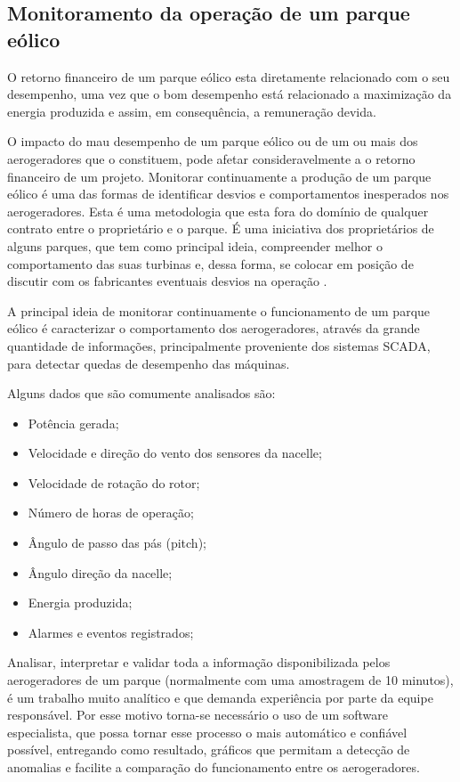 \subsection{Monitoramento da operação de um parque eólico }
\label{Sec:monitoramentoDeUmParqueEolico}

O retorno financeiro de um parque eólico esta diretamente relacionado com o seu desempenho, uma vez que o bom desempenho está relacionado a maximização da energia produzida e assim, em consequência, a remuneração devida.

O impacto do mau desempenho de um parque eólico ou de um ou mais dos aerogeradores que o constituem, pode afetar consideravelmente a o retorno financeiro de um projeto. Monitorar continuamente a produção de um parque eólico é uma das formas de identificar desvios e comportamentos inesperados nos aerogeradores. Esta é uma metodologia que esta fora do domínio de qualquer contrato entre o proprietário e o parque. É uma iniciativa dos proprietários de alguns parques, que tem como principal ideia, compreender melhor o comportamento das suas turbinas e, dessa forma, se colocar em posição de discutir com os fabricantes eventuais desvios na operação \cite{metodologia-avaliacao-desempenho-de-parques}.

A principal ideia de monitorar continuamente o funcionamento de um parque eólico é caracterizar o comportamento dos aerogeradores, através da grande quantidade de informações, principalmente proveniente dos sistemas SCADA, para detectar quedas de desempenho das máquinas.

Alguns dados que são comumente analisados são:
\begin{itemize}
    \item Potência gerada;
    \item Velocidade e direção do vento dos sensores da nacelle;
    \item Velocidade de rotação do rotor;
    \item Número de horas de operação;
    \item Ângulo de passo das pás (pitch);
    \item Ângulo direção da nacelle;
    \item Energia produzida;
    \item Alarmes e eventos registrados;
\end{itemize}

Analisar, interpretar e validar toda a informação disponibilizada pelos aerogeradores de um parque (normalmente com uma amostragem de 10 minutos), é um trabalho muito analítico e que demanda experiência por parte da equipe responsável. Por esse motivo torna-se necessário o uso de um software especialista, que possa tornar esse processo o mais automático e confiável possível, entregando como resultado, gráficos que permitam a detecção de anomalias e facilite a comparação do funcionamento entre os aerogeradores.

